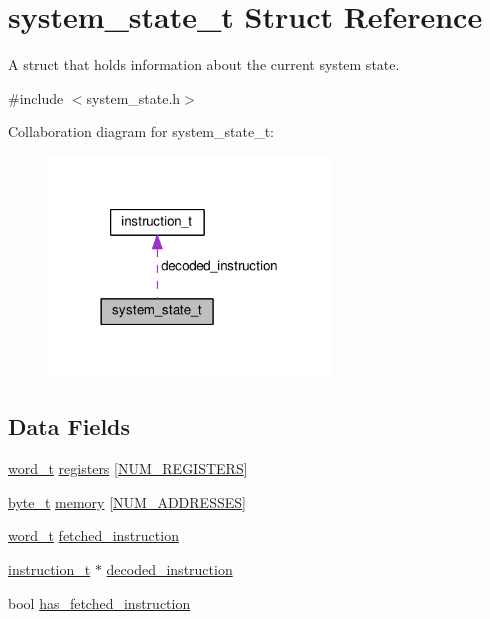 \hypertarget{structsystem__state__t}{}\section{system\+\_\+state\+\_\+t Struct Reference}
\label{structsystem__state__t}


A struct that holds information about the current system state.  




{\ttfamily \#include $<$system\+\_\+state.\+h$>$}



Collaboration diagram for system\+\_\+state\+\_\+t\+:\nopagebreak
\begin{figure}[H]
\begin{center}
\leavevmode
\includegraphics[width=213pt]{structsystem__state__t__coll__graph}
\end{center}
\end{figure}
\subsection*{Data Fields}
\begin{DoxyCompactItemize}
\item 
\hyperlink{global_8h_a0e7744482eed560726581dae7d3cb8b2}{word\+\_\+t} \hyperlink{structsystem__state__t_af042206b1a035449b5a10250fdc29e8f}{registers} \mbox{[}\hyperlink{global_8h_a5efff3a4a48efbf589e3a2320997d9b9}{N\+U\+M\+\_\+\+R\+E\+G\+I\+S\+T\+E\+RS}\mbox{]}
\item 
\hyperlink{global_8h_a0661d7d1353e0bca70c64563f635b034}{byte\+\_\+t} \hyperlink{structsystem__state__t_ade4e6995025b3b8eeeb62bdb38408765}{memory} \mbox{[}\hyperlink{global_8h_ad1d337f69c5203493cb37cb203c33e24}{N\+U\+M\+\_\+\+A\+D\+D\+R\+E\+S\+S\+ES}\mbox{]}
\item 
\hyperlink{global_8h_a0e7744482eed560726581dae7d3cb8b2}{word\+\_\+t} \hyperlink{structsystem__state__t_a9cb73fc3980fae6ad4eff34e8461d947}{fetched\+\_\+instruction}
\item 
\hyperlink{structinstruction__t}{instruction\+\_\+t} $\ast$ \hyperlink{structsystem__state__t_ab53a970384d9c812a2a4c6e327b19a95}{decoded\+\_\+instruction}
\item 
bool \hyperlink{structsystem__state__t_afe188f4e4c4fed3fab882599cfdafa76}{has\+\_\+fetched\+\_\+instruction}
\end{DoxyCompactItemize}


